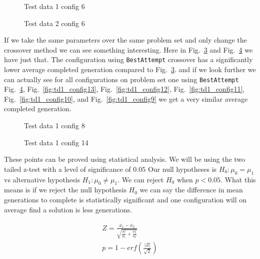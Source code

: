 \documentclass[conference]{IEEEtran}
\begin{document}
\begin{figure}[H]
    \centering
    
    \caption{Test data 1 config 6}
    \label{fig:td1_config6}
\end{figure}

\begin{figure}[H]
    \centering
    
    \caption{Test data 2 config 6}
    \label{fig:td2_config6}
\end{figure}


If we take the same parameters over the same problem set and only change the crossover method we can see something interesting. Here in Fig.~\ref{fig:td1_config8} and Fig.~\ref{fig:td1_config14} we have just that. The configuration using \texttt{BestAttempt} crossover has a significantly lower average completed generation compared to Fig.~\ref{fig:td1_config8}. and if we look further we can actually see for all configurations on problem set one using \texttt{BestAttempt} Fig.~\ref{fig:td1_config14}, Fig.~\ref{fig:td1_config13}, Fig.~\ref{fig:td1_config12}, Fig.~\ref{fig:td1_config11}, Fig.~\ref{fig:td1_config10}, and Fig.~\ref{fig:td1_config9} we get a very similar average completed generation. 
\begin{figure}[H]
    \centering
    
    \caption{Test data 1 config 8}
    \label{fig:td1_config8}
\end{figure}
\begin{figure}[H]
    \centering
    
    \caption{Test data 1 config 14}
    \label{fig:td1_config14}
\end{figure}

These points can be proved using statistical analysis. We will be using the two tailed z-test with a level of significance of $0.05$ Our null hypotheses is $H_0: \mu_0=\mu_1$ vs alternative hypothesis $H_1: \mu_0\neq \mu_1$. We can reject $H_0$ when $p<0.05$. What this means is if we reject the null hypothesis $H_0$ we can say the difference in mean generations to complete is statistically significant and one configuration will on average find a solution is less generations. 
\begin{center}
\large
\begin{gather}
Z=\frac{\overline{x_1}-\overline{x_2}}{\sqrt{\frac{\sigma_1^2}{n_1}+\frac{\sigma_2^2}{n_2}}} \label{ZValue}\\
p=1-erf(\frac {|Z|}{\sqrt{2}}) \label{pValue}
\end{gather}
\end{center}
\end{document}
